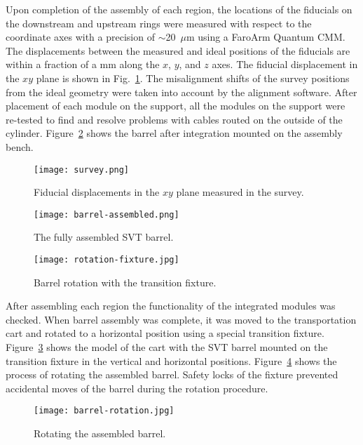 Upon completion of the assembly of each region, the locations of the fiducials on the downstream and upstream rings were measured with respect to the coordinate axes with a precision of $\sim$20~$\mu$m using a FaroArm Quantum CMM. The displacements between the measured and ideal positions of the fiducials are within a fraction of a mm along the $x$, $y$, and $z$ axes. The fiducial displacement in the $xy$ plane is shown in Fig.~\ref{fig:survey}. The misalignment shifts of the survey positions from the ideal geometry were taken into account by the alignment software. After placement of each module on the support, all the modules on the support were re-tested to find and resolve problems with cables routed on the outside of the cylinder. Figure~\ref{fig:barrel-assembled} shows the barrel after integration mounted on the assembly bench.

\begin{figure}[hbt]
\centering 
\texttt{[image: survey.png]}
\caption{Fiducial displacements in the $xy$ plane measured in the survey.}
\label{fig:survey}
\end{figure}

\begin{figure}[hbt] 
\centering 
\texttt{[image: barrel-assembled.png]}
\caption{The fully assembled SVT barrel.}
\label{fig:barrel-assembled}
\end{figure}

\begin{figure}[hbt] 
\centering 
\texttt{[image: rotation-fixture.jpg]}
\caption{Barrel rotation with the transition fixture.}
\label{fig:rotation-fixture}
\end{figure}

After assembling each region the functionality of the integrated modules was checked. When barrel assembly was complete, it was moved to the transportation cart and rotated to a horizontal position using a special transition fixture. Figure~\ref{fig:rotation-fixture} shows the model of the cart with the SVT barrel mounted on the transition fixture in the vertical and horizontal positions. Figure~\ref{fig:barrel-rotation} shows the process of rotating the assembled barrel. Safety locks of the fixture prevented accidental moves of the barrel during the rotation procedure.

\begin{figure}[hbt] 
\centering 
\texttt{[image: barrel-rotation.jpg]}
\caption{Rotating the assembled barrel.}
\label{fig:barrel-rotation}
\end{figure}

